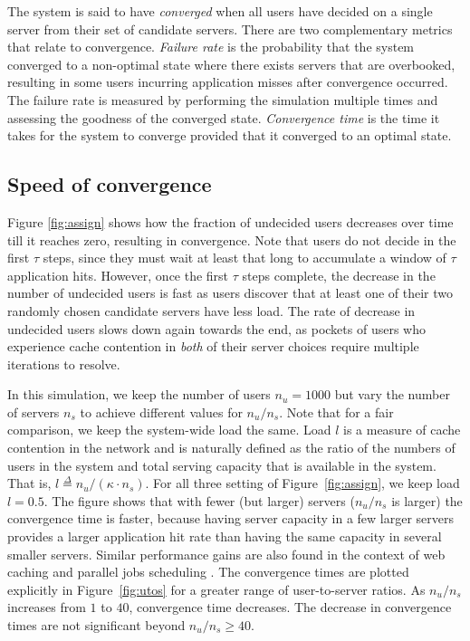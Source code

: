 \documentclass[conference]{IEEEtran}
\begin{document}
The system is said to have {\em converged\/} when all users have decided on a single server from their set of candidate servers. There are two complementary metrics that relate to convergence.  {\em Failure rate} is the probability that the system converged to a non-optimal state where there exists servers that are overbooked, resulting in some users  incurring application misses after convergence occurred. The failure rate is measured by performing the simulation multiple times and assessing the goodness of the converged state. {\em Convergence time} is the time it takes for the system to converge provided that it converged to an optimal state.

\subsection{Speed of convergence}



Figure \ref{fig:assign} shows how the fraction of undecided users decreases over time till it reaches zero, resulting in convergence. Note that users do not decide in the first $\tau$ steps, since they must wait at least that long to accumulate a window of $\tau$ application hits. However, once the first $\tau$ steps complete,  the decrease in the number of undecided users is fast as users discover that at least one of their two randomly chosen candidate servers have less load. The rate of decrease in undecided users slows down again towards the end, as pockets of users who experience cache contention in {\em both} of their server choices require multiple iterations to resolve.

In this simulation, we keep the number of users $n_u = 1000$ but vary the number of servers $n_s$ to achieve different values for $n_u/n_s$. Note that for a fair comparison, we keep the system-wide load  the same.  Load $l$ is a measure of cache contention in the network and is naturally defined as the ratio of the numbers of users in the system and total serving capacity that is available in the system. That is, $l  \stackrel{\Delta}{=} n_u/ (\kappa \cdot n_s)$.
For all three setting of Figure~\ref{fig:assign}, we keep load $l = 0.5$. The figure shows that with fewer (but larger) servers ($n_u/n_s$ is larger) the convergence time is faster, because having server capacity in a few larger servers provides a larger application hit rate than having the same capacity in several smaller servers. Similar performance gains are also found in the context of web caching and parallel jobs scheduling \cite{Sparrow}. The convergence times are plotted explicitly in 
Figure~\ref{fig:utos} for a greater range of  user-to-server ratios. As $n_u/n_s$ increases from $1$ to $40$, convergence time decreases. The decrease in convergence times are not significant beyond $n_u/n_s \geq 40$.
\end{document}

